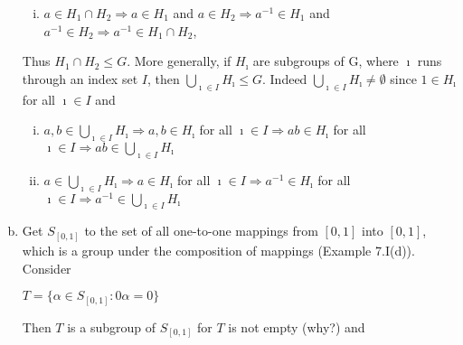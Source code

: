 \documentclass{article}
\begin{document}
\begin{enumerate}[(a)]
\begin{enumerate}[(i)]
            \item $a \in H_{1} \cap H_{2} \Longrightarrow a \in H_{1}$ and $a \in H_{2} \Longrightarrow a^{-1} \in H_{1}$ and $a^{-1} \in H_{2} \Longrightarrow a^{-1} \in H_{1} \cap H_{2}$,
        \end{enumerate}    
        Thus $H_{1} \cap H_{2} \leqslant G$. More generally, if $H_{\imath}$ are subgroups of G, where $\imath$ runs through an index set $I$, then $\bigcup\limits_{\imath \in I}^{} H_{\imath} \leqslant G$. Indeed $\bigcup\limits_{\imath \in I}^{} H_{\imath} \ne \emptyset$ since $1 \in H_{\imath}$ for all $\imath \in I$ and
        \begin{enumerate}[(i)]
            \item $a,b \in \bigcup\limits_{\imath \in I}^{} H_{\imath} \Longrightarrow a,b \in H_{\imath}$ for all $\imath \in I \Longrightarrow ab \in H_{\imath}$ for all $\imath \in I \Longrightarrow ab \in \bigcup\limits_{\imath \in I}^{} H_{\imath}$
            \item $a \in \bigcup\limits_{\imath \in I}^{} H_{\imath} \Longrightarrow a \in H_{\imath}$ for all $\imath \in I \Longrightarrow a^{-1} \in H_{\imath}$ for all $\imath \in I \Longrightarrow a^{-1} \in \bigcup\limits_{\imath \in I}^{} H_{\imath}$
        \end{enumerate}
        \item Get $S_{[0,1]}$ to the set of all one-to-one mappings from $[0,1]$ into $[0,1]$, which is a group under the composition of mappings (Example 7.I(d)). Consider
        \begin{center}
            $T=\{\alpha \in S_{[0,1]} : 0 \alpha =0\}$
        \end{center}
        Then $T$ is a subgroup of $S_{[0,1]}$ for $T$ is not empty (why?) and
    \end{enumerate}
\end{document}
